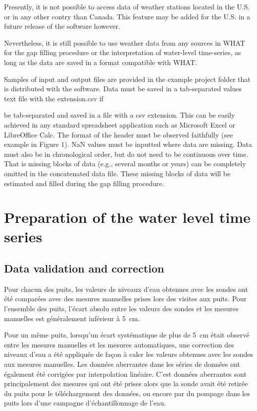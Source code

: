 \documentclass[12pt, letterpaper, fleqn]{report}
\begin{document}
Presently, it is not possible to access data of weather stations located in the U.S. or in any other contry than Canada. This feature may be added for the U.S. in a future release of the software however.

Nevertheless, it is still possible to use weather data from any sources in WHAT for the gap filling procedure or the interpretation of water-level time-series, as long as the data are saved in a format compatible with WHAT.

Samples of input and output files are provided in the example project folder that is distributed with the software. Data must be saved in a tab-separated values text file with the extension.csv if 

be tab-separated and saved in a file with a csv extension. This can be easily achieved in any standard spreadsheet application such as Microsoft Excel or LibreOffice Calc. The format of the header must be observed faithfully (see example in Figure 1). NaN values must be inputted where data are missing. Data must also be in chronological order, but do not need to be continuous over time. That is missing blocks of data (e.g., several months or years) can be completely omitted in the concatenated data file. These missing blocks of data will be estimated and filled during the gap filling procedure.

\section{Preparation of the water level time series}

\subsection{Data validation and correction}

Pour chacun des puits, les valeurs de niveaux d’eau obtenues avec les sondes ont été comparées avec des mesures manuelles prises lors des visites aux puits. Pour l’ensemble des puits, l’écart absolu entre les valeurs des sondes et les mesures manuelles est généralement inférieur à 5 cm.

Pour un même puits, lorsqu'un écart systématique de plus de 5 cm était observé entre les mesures manuelles et les mesures automatiques, une correction des niveaux d’eau a été  appliquée de façon à caler les valeurs obtenues avec les sondes aux mesures manuelles.
Les données aberrantes dans les séries de données ont également été corrigées par interpolation linéaire. C’est données aberrantes sont principalement des mesures qui ont été prises alors que la sonde avait été retirée du puits pour le téléchargement des données, ou encore par du pompage dans les puits lors d’une campagne d’échantillonnage de l’eau.
\end{document}
